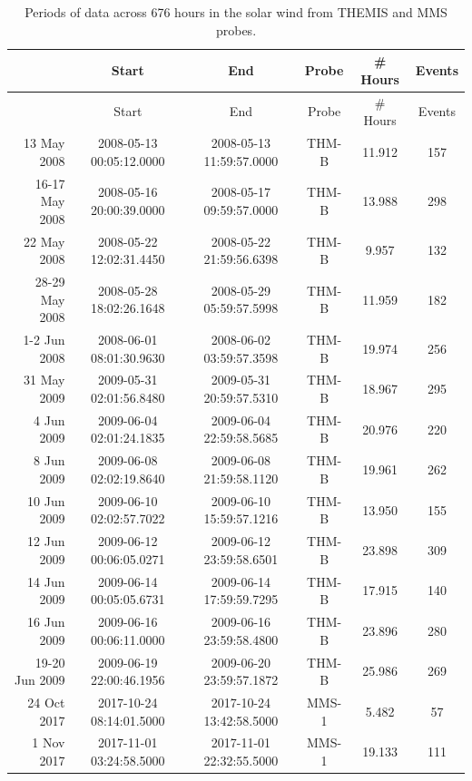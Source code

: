 \begin{longtable}{r|ccccc}
\caption{Periods of data across 676 hours in the solar wind from THEMIS and MMS probes.} \\
\hline
            {} &                     Start &                       End &  Probe &  \# Hours & Events \\
\hline
\endfirsthead
\hline
            {} &                     Start &                       End &  Probe &  \# Hours & Events \\
\hline
\endhead
13 May 2008    &  2008-05-13 00:05:12.0000 &  2008-05-13 11:59:57.0000 &  THM-B &   11.912 &    157 \\
16-17 May 2008 &  2008-05-16 20:00:39.0000 &  2008-05-17 09:59:57.0000 &  THM-B &   13.988 &    298 \\
22 May 2008    &  2008-05-22 12:02:31.4450 &  2008-05-22 21:59:56.6398 &  THM-B &    9.957 &    132 \\
28-29 May 2008 &  2008-05-28 18:02:26.1648 &  2008-05-29 05:59:57.5998 &  THM-B &   11.959 &    182 \\
1-2 Jun 2008   &  2008-06-01 08:01:30.9630 &  2008-06-02 03:59:57.3598 &  THM-B &   19.974 &    256 \\
31 May 2009    &  2009-05-31 02:01:56.8480 &  2009-05-31 20:59:57.5310 &  THM-B &   18.967 &    295 \\
4 Jun 2009     &  2009-06-04 02:01:24.1835 &  2009-06-04 22:59:58.5685 &  THM-B &   20.976 &    220 \\
8 Jun 2009     &  2009-06-08 02:02:19.8640 &  2009-06-08 21:59:58.1120 &  THM-B &   19.961 &    262 \\
10 Jun 2009    &  2009-06-10 02:02:57.7022 &  2009-06-10 15:59:57.1216 &  THM-B &   13.950 &    155 \\
12 Jun 2009    &  2009-06-12 00:06:05.0271 &  2009-06-12 23:59:58.6501 &  THM-B &   23.898 &    309 \\
14 Jun 2009    &  2009-06-14 00:05:05.6731 &  2009-06-14 17:59:59.7295 &  THM-B &   17.915 &    140 \\
16 Jun 2009    &  2009-06-16 00:06:11.0000 &  2009-06-16 23:59:58.4800 &  THM-B &   23.896 &    280 \\
19-20 Jun 2009 &  2009-06-19 22:00:46.1956 &  2009-06-20 23:59:57.1872 &  THM-B &   25.986 &    269 \\
24 Oct 2017    &  2017-10-24 08:14:01.5000 &  2017-10-24 13:42:58.5000 &  MMS-1 &    5.482 &     57 \\
1 Nov 2017     &  2017-11-01 03:24:58.5000 &  2017-11-01 22:32:55.5000 &  MMS-1 &   19.133 &    111 \\

\end{longtable}
